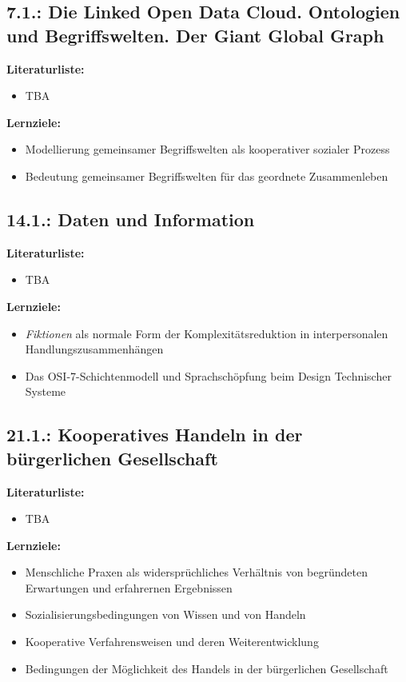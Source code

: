 \documentclass[11pt,a4paper]{article}
\begin{document}
\subsection{7.1.: Die Linked Open Data Cloud. Ontologien und Begriffswelten.
Der Giant Global Graph}

\textbf{Literaturliste:}
\begin{itemize}
\item TBA
\end{itemize}

\textbf{Lernziele:}
\begin{itemize}[noitemsep]
\item Modellierung gemeinsamer Begriffswelten als kooperativer sozialer
  Prozess 
\item Bedeutung gemeinsamer Begriffswelten für das geordnete Zusammenleben 
\end{itemize}

\subsection{14.1.: Daten und Information}

\textbf{Literaturliste:}
\begin{itemize}
\item TBA
\end{itemize}

\textbf{Lernziele:}
\begin{itemize}[noitemsep]
\item \emph{Fiktionen} als normale Form der Komplexitätsreduktion in
  interpersonalen Handlungszusammenhängen
\item Das OSI-7-Schichtenmodell und Sprachschöpfung beim Design Technischer
  Systeme  
\end{itemize}

\subsection{21.1.: Kooperatives Handeln in der bürgerlichen Gesellschaft}

\textbf{Literaturliste:}
\begin{itemize}
\item TBA
\end{itemize}

\textbf{Lernziele:}
\begin{itemize}[noitemsep]
\item Menschliche Praxen als widersprüchliches Verhältnis von begründeten
  Erwartungen und erfahrernen Ergebnissen
\item Sozialisierungsbedingungen von Wissen und von Handeln
\item Kooperative Verfahrensweisen und deren Weiterentwicklung
\item Bedingungen der Möglichkeit des Handels in der bürgerlichen Gesellschaft 
\end{itemize}
\end{document}
